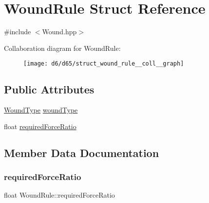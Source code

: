 \hypertarget{struct_wound_rule}{}\section{Wound\+Rule Struct Reference}
\label{struct_wound_rule}


{\ttfamily \#include $<$Wound.\+hpp$>$}



Collaboration diagram for Wound\+Rule\+:
\nopagebreak
\begin{figure}[H]
\begin{center}
\leavevmode
\texttt{[image: d6/d65/struct\_wound\_rule\_\_coll\_\_graph]}
\end{center}
\end{figure}
\subsection*{Public Attributes}
\begin{DoxyCompactItemize}
\item 
\mbox{\hyperlink{_enum_types_8hpp_a585daaeecd1f9f1350c24bf0081a734e}{Wound\+Type}} \mbox{\hyperlink{struct_wound_rule_a839c23c859a5163785778a61a093970c}{wound\+Type}}
\item 
float \mbox{\hyperlink{struct_wound_rule_a7dd7ebd04b9692ca39b3914806f81b12}{required\+Force\+Ratio}}
\end{DoxyCompactItemize}


\subsection{Member Data Documentation}
\mbox{\label{struct_wound_rule_a7dd7ebd04b9692ca39b3914806f81b12}} 
\subsubsection{\texorpdfstring{required\+Force\+Ratio}{requiredForceRatio}}
{\footnotesize\ttfamily float Wound\+Rule\+::required\+Force\+Ratio}

\mbox{\label{struct_wound_rule_a839c23c859a5163785778a61a093970c}} 

